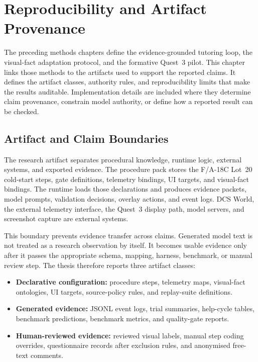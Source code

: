 %
\chapter{Reproducibility and Artifact Provenance}\label{ch:implementation}

The preceding methods chapters define the evidence-grounded tutoring loop, the
visual-fact adaptation protocol, and the formative Quest~3 pilot. This chapter
links those methods to the artifacts used to support the reported claims. It
defines the artifact classes, authority rules, and reproducibility limits that
make the results auditable. Implementation details are included where they
determine claim provenance, constrain model authority, or define how a reported
result can be checked.

\section{Artifact and Claim Boundaries}\label{sec:impl-boundaries}

The research artifact separates procedural knowledge, runtime logic, external
systems, and exported evidence. The procedure pack stores the F/A-18C Lot~20
cold-start steps, gate definitions, telemetry bindings, UI targets, and
visual-fact bindings. The runtime loads those declarations and produces
evidence packets, model prompts, validation decisions, overlay actions, and
event logs. DCS World, the external telemetry interface, the Quest~3 display path, model servers, and
screenshot capture are external systems.

This boundary prevents evidence transfer across claims. Generated model text is
not treated as a research observation by itself. It becomes usable evidence only
after it passes the appropriate schema, mapping, harness, benchmark, or manual
review step. The thesis therefore reports three artifact classes:

\begin{itemize}
\item \textbf{Declarative configuration:} procedure steps, telemetry maps,
visual-fact ontologies, UI targets, source-policy rules, and replay-suite
definitions.
\item \textbf{Generated evidence:} JSONL event logs, trial summaries, help-cycle
tables, benchmark predictions, benchmark metrics, and quality-gate reports.
\item \textbf{Human-reviewed evidence:} reviewed visual labels, manual step
coding overrides, questionnaire records after exclusion rules, and anonymised
free-text comments.
\end{itemize}

